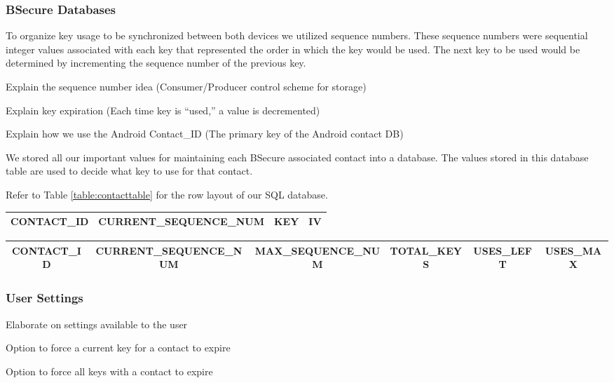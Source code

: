 \subsubsection{BSecure Databases}
To organize key usage to be synchronized between both devices we utilized sequence numbers.
These sequence numbers were sequential integer values associated with each key that represented the
order in which the key would be used. The next key to be used would be determined by incrementing the sequence
number of the previous key.

Explain the sequence number idea (Consumer/Producer control scheme for storage)

Explain key expiration (Each time key is ``used,'' a value is decremented)

Explain how we use the Android Contact\_ID (The primary key of the Android contact DB)

We stored all our important values for maintaining each BSecure associated contact
into a database. The values stored in this database table are used to decide what key to use for that
contact.

Refer to Table \ref{table:contacttable} for the row layout of our SQL database.

\begin{table*}
\centering
\caption{Key Table Design}
\label{table:contacttable}
\begin{tabular}{|c|c|c|c|} \hline
CONTACT\_ID&CURRENT\_SEQUENCE\_NUM&KEY&IV\\ \hline\end{tabular}
\end{table*}

\begin{table*}
\centering
\caption{Contact Table Design}
\label{table:contacttable}
\begin{tabular}{|c|c|c|c|c|c|} \hline
CONTACT\_ID&CURRENT\_SEQUENCE\_NUM&MAX\_SEQUENCE\_NUM&TOTAL\_KEYS&USES\_LEFT&USES\_MAX\\ \hline\end{tabular}
\end{table*}


\subsubsection{User Settings}
Elaborate on settings available to the user

Option to force a current key for a contact to expire

Option to force all keys with a contact to expire

